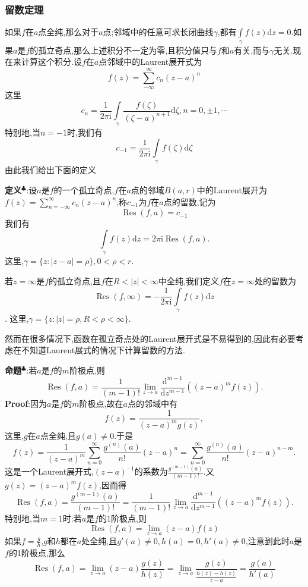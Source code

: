 \subsubsection{留数定理}
如果$f$在$a$点全纯,那么对于$a$点;邻域中的任意可求长闭曲线$\gamma$,都有$\int\limits_{\gamma}f(z)\mathrm{d}z=0$.如果$a$是$f$的孤立奇点,那么上述积分不一定为零,且积分值只与$f$和$a$有关,而与$\gamma$无关.现在来计算这个积分.设$f$在$a$点邻域中的Laurent展开式为
$$
f(z)=\sum^{\infty}_{-\infty}c_n (z-a)^n
$$
这里
$$
c_n=\frac{1}{2\pi\mathrm{i}}\int\limits_{\gamma }\frac{f(\zeta)}{(\zeta-a)^{n+1}}\mathrm{d}\zeta,n=0,\pm 1,\cdots
$$
特别地,当$n=-1$时,我们有
$$
c_{-1}=\frac{1}{2\pi\mathrm{i}}\int\limits_{\gamma}f(\zeta)\mathrm{d}\zeta
$$
由此我们给出下面的定义\par
\textbf{定义}$^\clubsuit$:设$a$是$f$的一个孤立奇点,$f$在$a$点的邻域$B(a,r)$中的Laurent展开为$f(z)=\sum_{n=-\infty}^{\infty}c_n(z-a)^n$,称$c_{-1}$为$f$在$a$点的留数,记为
$$
\operatorname{Res}(f,a)=c_{-1}
$$
我们有
$$
\int\limits_\gamma f(z)\mathrm{d}z=2\pi \mathrm{i} \operatorname{Res}(f,a).
$$
这里,$\gamma=\{z:|z-a|=\rho\},0<\rho<r.$\par
若$z=\infty$是$f$的孤立奇点,且$f$在$R<|z|<\infty$中全纯,我们定义$f$在$z=\infty$处的留数为
$$
\operatorname{Res}(f,\infty)=-\frac{1}{2\pi \mathrm{i}}\int\limits_\gamma f(z)\mathrm{d}z
$$.
这里,$\gamma=\{z:|z|=\rho,R<\rho<\infty\}$.\par
然而在很多情况下,函数在孤立奇点处的Laurent展开式是不易得到的,因此有必要考虑在不知道Laurent展式的情况下计算留数的方法.\par
\textbf{命题}$^\clubsuit$:若$a$是$f$的$m$阶极点,则
$$
\operatorname{Res}(f,a)=\frac{1}{(m-1)!}\lim_{z\to a}\frac{\mathrm{d}^{m-1}}{\mathrm{d}z^{m-1}}((z-a)^mf(z)).
$$
\qquad \textbf{Proof}:因为$a$是$f$的$m$阶极点,故在$a$点的邻域中有
$$
f(z)=\frac{1}{(z-a)^mg(z)},
$$
这里,$g$在$a$点全纯,且$g(a)\neq0$.于是
$$
f(z)=\frac{1}{(z-a)^m}\sum_{n=0}^\infty\frac{g^{(n)}(a)}{n!}(z-a)^n=\sum_{n=0}^\infty\frac{g^{(n)}(a)}{n!}(z-a)^{n-m}.
$$
这是一个Laurent展开式,$(z-a)^{-1}$的系数为$\frac{g^{(m-1)}(a)}{(m-1)!}$.又$g(z)=(z-a)^mf(z)$,因而得
$$
\operatorname{Res}(f,a)=\frac{g^{(m-1)}(a)}{(m-1)!}=\frac{1}{(m-1)!}\lim_{z\to a}\frac{\mathrm{d}^{m-1}}{\mathrm{d}z^{m-1}}((z-a)^mf(z)).
$$
特别地,当$m=1$时:若$a$是$f$的1阶极点,则
$$
\operatorname{Res}(f,a)=\lim_{z\to a}(z-a)f(z)
$$
如果$f=\frac{g}{h}$,$g$和$h$都在$a$处全纯,且$g'(a)\neq 0,h(a)=0,h'(a)\neq 0$,注意到此时$a$是$f$的1阶极点,那么
$$
\operatorname{Res}(f,a)=\lim_{z\to a}(z-a)\frac{g(z)}{h(z)}=\lim_{z\to a}\frac{g(z)}{\frac{h(z)-h(z)}{z-a}}=\frac{g(a)}{h'(a)}
$$
